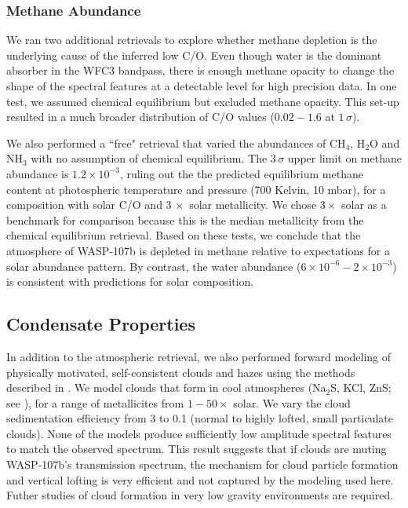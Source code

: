 \documentclass[twocolumn, trackchanges]{aastex61}
\begin{document}
\subsubsection{Methane Abundance}
We ran two additional retrievals to explore whether methane depletion is the underlying cause of the inferred low C/O.  Even though water is the dominant absorber in the WFC3 bandpass, there is enough methane opacity to change the shape of the spectral features at a detectable level for high precision data.  In one test, we assumed chemical equilibrium but excluded methane opacity. This set-up resulted in a much broader distribution of C/O values ($0.02 - 1.6$ at $1\,\sigma$). 

We also performed a ``free" retrieval that varied the abundances of CH$_4$, H$_2$O and NH$_3$ with no assumption of chemical equilibrium. The $3\,\sigma$ upper limit on methane abundance is $1.2\times10^{-3}$, ruling out the the predicted equilibrium methane content at photospheric temperature and pressure (700 Kelvin, 10 mbar), for a composition with solar C/O and $3\,\times$ solar metallicity. We chose $3\times$ solar as a benchmark for comparison because this is the median metallicity from the chemical equilibrium retrieval.  Based on these tests, we conclude that the atmosphere of WASP-107b is depleted in methane relative to expectations for a solar abundance pattern. By contrast, the water abundance ($6\times10^{-6} - 2\times10^{-3}$) is consistent with predictions for solar composition.

\subsection{Condensate Properties}
In addition to the atmospheric retrieval, we also performed forward modeling of physically motivated, self-consistent clouds and hazes using the methods described in \cite{fortney08, morley15}.  We model clouds that form in cool atmospheres (Na$_2$S, KCl, ZnS; see \citealt{morley12}), for a range of metallicites from $1-50\times$ solar. We vary the cloud sedimentation efficiency from 3 to 0.1 (normal to highly lofted, small particulate clouds). None of the models produce sufficiently low amplitude spectral features to match the observed spectrum.  This result suggests that if clouds are muting WASP-107b's transmission spectrum, the mechanism for cloud particle formation and vertical lofting is very efficient and not captured by the modeling used here. Futher studies of cloud formation in very low gravity environments are required.  
\end{document}
